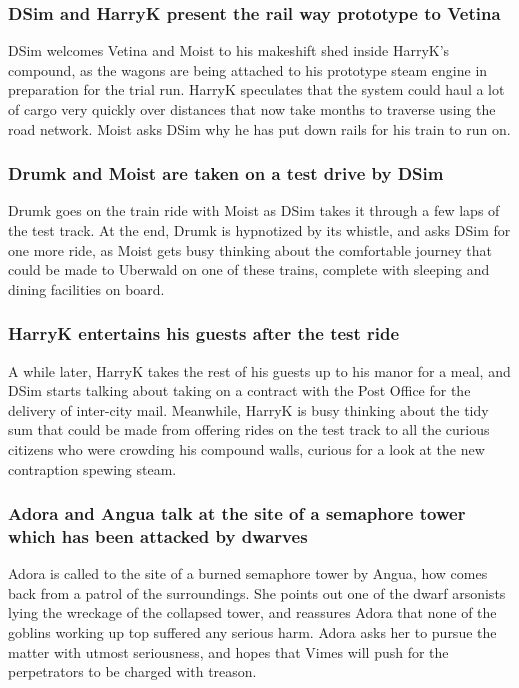 \subsubsection{\Gls{DSim} and \Gls{HarryK} present the rail way prototype to \Gls{Vetina}}
\Gls{DSim} welcomes \Gls{Vetina} and \Gls{Moist} to his makeshift shed inside \Gls{HarryK}'s
compound, as the wagons are being attached to his prototype steam engine in preparation for the
trial run. \Gls{HarryK} speculates that the system could haul a lot of cargo very quickly over
distances that now take months to traverse using the road network. \Gls{Moist} asks \Gls{DSim}
why he has put down rails for his train to run on.

\subsubsection{\Gls{Drumk} and \Gls{Moist} are taken on a test drive by \Gls{DSim}}
\Gls{Drumk} goes on the train ride with \Gls{Moist} as \Gls{DSim} takes it through a few laps of
the test track. At the end, \Gls{Drumk} is hypnotized by its whistle, and asks \Gls{DSim} for one
more ride, as \Gls{Moist} gets busy thinking about the comfortable journey that could be made to
Uberwald on one of these trains, complete with sleeping and dining facilities on board.

\subsubsection{\Gls{HarryK} entertains his guests after the test ride}
A while later, \Gls{HarryK} takes the rest of his guests up to his manor for a meal, and \Gls{DSim}
starts talking about taking on a contract with the Post Office for the delivery of inter-city mail.
Meanwhile, \Gls{HarryK} is busy thinking about the tidy sum that could be made from offering rides
on the test track to all the curious citizens who were crowding his compound walls, curious for a
look at the new contraption spewing steam.

\subsubsection{\Gls{Adora} and \Gls{Angua} talk at the site of a semaphore tower which has been
    attacked by dwarves}
\Gls{Adora} is called to the site of a burned semaphore tower by \Gls{Angua}, how comes back from
a patrol of the surroundings. She points out one of the dwarf arsonists lying the wreckage of the
collapsed tower, and reassures \Gls{Adora} that none of the goblins working up top suffered any
serious harm. \Gls{Adora} asks her to pursue the matter with utmost seriousness, and hopes that
\Gls{Vimes} will push for the perpetrators to be charged with treason.


